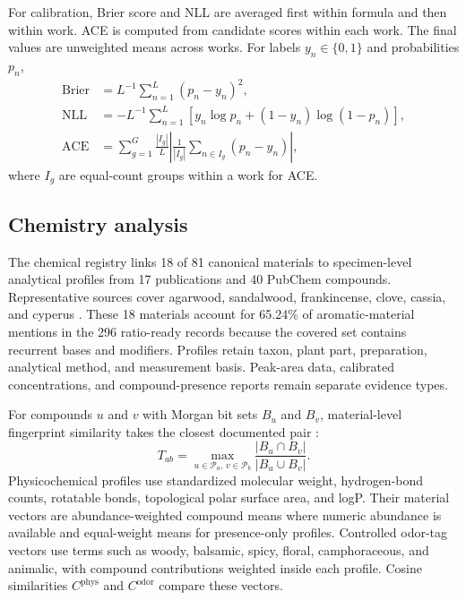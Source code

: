 \documentclass[11pt,a4paper]{article}
\begin{document}
For calibration, Brier score and NLL are averaged first within formula and then within work. ACE is computed from candidate scores within each work. The final values are unweighted means across works. For labels $y_n\in\{0,1\}$ and probabilities $p_n$,
\begin{align}
\operatorname{Brier}&=L^{-1}\sum_{n=1}^{L}(p_n-y_n)^2,\\
\operatorname{NLL}&=-L^{-1}\sum_{n=1}^{L}\left[y_n\log p_n+(1-y_n)\log(1-p_n)\right],\\
\operatorname{ACE}&=\sum_{g=1}^{G}\frac{|I_g|}{L}
\left|\frac{1}{|I_g|}\sum_{n\in I_g}(p_n-y_n)\right|,
\label{eq:calmetrics}
\end{align}
where $I_g$ are equal-count groups within a work for ACE.

\subsection{Chemistry analysis}

The chemical registry links 18 of 81 canonical materials to specimen-level analytical profiles from 17 publications and 40 PubChem compounds. Representative sources cover agarwood, sandalwood, frankincense, clove, cassia, and cyperus \citep{ngan2020_agarwood,fatima2019_sandalwood,distefano2020_frankincense,benhassine2021_clove,firmino2018_cassia,hu2017_cyperus}. These 18 materials account for 65.24\% of aromatic-material mentions in the 296 ratio-ready records because the covered set contains recurrent bases and modifiers. Profiles retain taxon, plant part, preparation, analytical method, and measurement basis. Peak-area data, calibrated concentrations, and compound-presence reports remain separate evidence types.

For compounds $u$ and $v$ with Morgan bit sets $B_u$ and $B_v$, material-level fingerprint similarity takes the closest documented pair \citep{rogers2010_morgan}:
\begin{equation}
T_{ab}=\max_{u\in\mathcal{P}_a,\,v\in\mathcal{P}_b}
\frac{|B_u\cap B_v|}{|B_u\cup B_v|}.
\label{eq:tanimoto}
\end{equation}
Physicochemical profiles use standardized molecular weight, hydrogen-bond counts, rotatable bonds, topological polar surface area, and logP. Their material vectors are abundance-weighted compound means where numeric abundance is available and equal-weight means for presence-only profiles. Controlled odor-tag vectors use terms such as woody, balsamic, spicy, floral, camphoraceous, and animalic, with compound contributions weighted inside each profile. Cosine similarities $C^{\mathrm{phys}}$ and $C^{\mathrm{odor}}$ compare these vectors.
\end{document}
